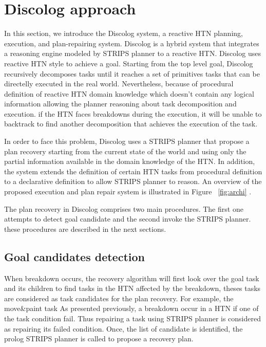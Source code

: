 \chapter{Discolog approach} %

\label{Chapter 4} %



 In this section, we introduce the Discolog system, a reactive HTN planning, execution, and plan-repairing system. Discolog is a   hybrid system that integrates  a reasoning engine modeled by STRIPS planner to a reactive HTN.
 Discolog uses reactive HTN style to achieve a goal.
 Starting from the top level goal, Discolog recursively decomposes tasks until it reaches a set of primitives tasks that can be directelly executed in the real world. 
 Nevertheless, because of procedural definition of reactive HTN domain knowledge which doesn't contain any logical information allowing the planner reasoning about task decomposition and execution. if the HTN faces breakdowns during the execution, it will be unable to backtrack  to find another decomposition that achieves the execution of the task.
 
 
In order to face this problem, Discolog uses a STRIPS planner that propose a plan recovery starting from the current state of the world and using only the partial information available in the domain knowledge of the HTN. In addition, the system extends the definition of certain HTN tasks from procedural definition to a declarative definition to allow STRIPS planner to reason. An overview of the proposed execution and plan repair system is illustrated in Figure ~\ref{fig:archi}   .
	

The plan recovery in Discolog comprises two main procedures. The first one attempts to detect goal candidate and the second invoke the STRIPS planner. these procedures are described in the next sections.
\section{Goal candidates detection}
When  breakdown occurs, the recovery algorithm will  first look over the goal task and its children to find  tasks in the HTN affected by the breakdown, theses tasks are considered as task candidates for the plan recovery. For example, the move\&paint task 
As presented previously, a breakdown occur in a HTN if one of the task condition fail. Thus repairing a task using STRIPS planner is considered as repairing its failed condition. Once, the list of candidate is identified, the prolog STRIPS planner is called to propose a recovery plan.
